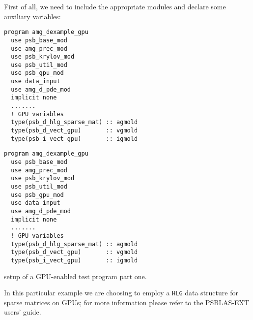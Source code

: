 First of all, we need to include the appropriate modules and
declare some auxiliary variables:
\begin{listing}[h!]
\ifpdf
\begin{verbatim}
program amg_dexample_gpu
  use psb_base_mod
  use amg_prec_mod
  use psb_krylov_mod
  use psb_util_mod
  use psb_gpu_mod
  use data_input
  use amg_d_pde_mod
  implicit none
  .......
  ! GPU variables
  type(psb_d_hlg_sparse_mat) :: agmold
  type(psb_d_vect_gpu)       :: vgmold
  type(psb_i_vect_gpu)       :: igmold
\end{verbatim}
\else
\begin{center}
\begin{minipage}{.90\textwidth}
{\small
\begin{verbatim}
program amg_dexample_gpu
  use psb_base_mod
  use amg_prec_mod
  use psb_krylov_mod
  use psb_util_mod
  use psb_gpu_mod
  use data_input
  use amg_d_pde_mod
  implicit none
  .......
  ! GPU variables
  type(psb_d_hlg_sparse_mat) :: agmold
  type(psb_d_vect_gpu)       :: vgmold
  type(psb_i_vect_gpu)       :: igmold

 \end{verbatim}
}
\end{minipage}
\end{center}
\fi
\caption{setup of a GPU-enabled test program part one.\label{fig:gpu-ex1}}
\end{listing}
In this particular example we are choosing to employ a \verb|HLG| data
structure for sparse matrices on GPUs; for more information please
refer to the PSBLAS-EXT users' guide.

